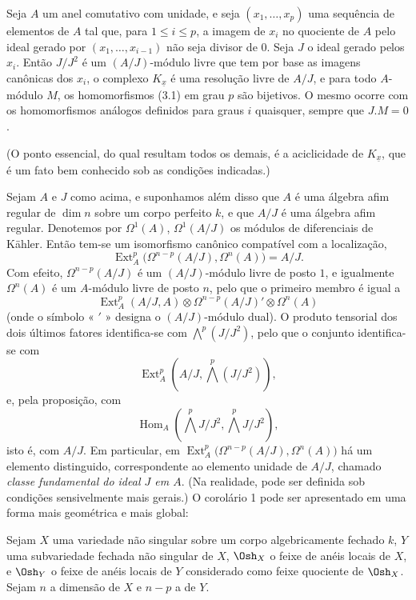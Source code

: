  Seja $A$ um anel comutativo com unidade, e seja
$(x_1,\ldots,x_p)$ uma sequência de elementos de $A$ tal que, para $1\leq i\leq p$,
a imagem de $x_i$ no quociente de $A$ pelo ideal gerado por
$(x_1,\ldots,x_{i-1})$ não seja divisor de $0$. Seja $J$ o ideal gerado
pelos $x_i$. Então $J/J^{2}$ é um $(A/J)$-módulo livre que tem por base as
imagens canônicas dos $x_i$, o complexo $K_{\underline{x}}$ é uma resolução
livre de $A/J$, e para todo $A$-módulo $M$, os homomorfismos (3.1) em
grau $p$ são bijetivos. O mesmo ocorre com os homomorfismos análogos
definidos para graus $i$ quaisquer, sempre que $J.M=0$.

(O ponto essencial, do qual resultam todos os demais, é a aciclicidade de
$K_{\underline{x}}$, que é um fato bem conhecido sob as condições indicadas.)

 Sejam $A$ e $J$ como acima, e suponhamos além disso que
$A$ é uma álgebra afim regular de $\dim n$ sobre um corpo perfeito $k$, e
que $A/J$ é uma álgebra afim regular. Denotemos por $\Omega^{1}(A)$,
$\Omega^{1}(A/J)$ os módulos de diferenciais de Kähler. Então tem-se um
isomorfismo canônico compatível com a localização,
\begin{equation}\tag{3.5}
  \operatorname{Ext}_{A}^{p}\bigl(\Omega^{n-p}(A/J),\Omega^{n}(A)\bigr)=A/J.
\end{equation}
Com efeito, $\Omega^{n-p}(A/J)$ é um $(A/J)$-módulo livre de posto $1$, e igualmente
$\Omega^{n}(A)$ é um $A$-módulo livre de posto $n$,
pelo que o primeiro membro é igual a
\[
  \operatorname{Ext}_{A}^{p}(A/J,A)
  \otimes\Omega^{n-p}(A/J)'\otimes\Omega^{n}(A)
\]
(onde o símbolo « $'$ » designa o $(A/J)$-módulo dual). O produto tensorial dos
dois últimos fatores identifica-se com $\bigwedge^{p}(J/J^{2})$, pelo que o conjunto
identifica-se com
\[
  \operatorname{Ext}_{A}^{p}\!\left(A/J,\bigwedge^{p}(J/J^{2})\right),
\]
e, pela proposição, com
\[
  \operatorname{Hom}_{A}\!\left(\bigwedge^{p}J/J^{2},
  \bigwedge^{p}J/J^{2}\right),
\]
isto é, com $A/J$. Em particular, em
$\operatorname{Ext}_{A}^{p}\bigl(\Omega^{n-p}(A/J),\Omega^{n}(A)\bigr)$ há um
elemento distinguido, correspondente ao elemento unidade de $A/J$, chamado
\emph{classe fundamental do ideal $J$ em $A$}. (Na realidade, pode
ser definida sob condições sensivelmente mais gerais.) O
corolário 1 pode ser apresentado em uma forma mais geométrica e mais global:

 Sejam $X$ uma variedade não singular sobre um corpo
algebricamente fechado $k$, $Y$ uma subvariedade fechada não singular de $X$,
$\Osh_X$ o feixe de anéis locais de $X$, e $\Osh_Y$ o feixe de anéis
locais de $Y$ considerado como feixe quociente de $\Osh_X$. Sejam $n$ a
dimensão de $X$ e $n-p$ a de $Y$.

